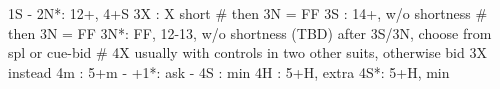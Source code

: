 1S - 2N*: 12+, 4+S
3X : X short  # then 3N = FF
3S : 14+, w/o shortness  # then 3N = FF
3N*: FF, 12-13, w/o shortness
(TBD) after 3S/3N, choose from spl or cue-bid
# 4X usually with controls in two other suits, otherwise bid 3X instead
4m : 5+m
   - +1*: ask
        - 4S : min
4H : 5+H, extra
4S*: 5+H, min